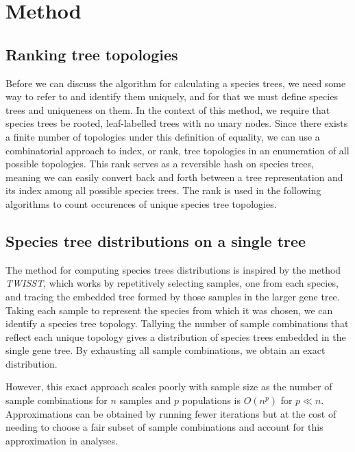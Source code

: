 \documentclass{article}
\newcommand{\twisst}{{\textit{TWISST}}}
\begin{document}
\section{Method}
\subsection{Ranking tree topologies}

Before we can discuss the algorithm for calculating a species trees, we
need some way to refer to and identify them uniquely, and for that we must
define species trees and uniqueness on them. In the context of this method,
we require that species trees be rooted, leaf-labelled trees with no
unary nodes.
Since there exists a finite number of topologies under this definition
of equality, we can use a combinatorial approach to index, or rank,
tree topologies in an enumeration of all possible topologies.
This rank serves as a reversible hash on species trees, meaning we can
easily convert back and forth between a tree representation and its
index among all possible species trees. The rank is used in the following
algorithms to count occurences of unique species tree topologies.

\subsection{Species tree distributions on a single tree}

The method for computing species trees distributions is inspired by the method
\twisst, which works
by repetitively selecting samples, one from each species, and tracing the
embedded tree formed by those samples in the larger gene tree. Taking each
sample to represent the species from which it was chosen, we can identify
a species tree topology. Tallying the number of sample combinations that
reflect each unique topology gives a distribution of species trees
embedded in the single gene tree. By exhausting all sample combinations,
we obtain an exact distribution.

However, this exact approach scales poorly with sample size as the number
of sample combinations for $n$ samples and $p$ populations is $O(n^p)$ for
$p \ll n$. Approximations can be obtained by running fewer iterations but
at the cost of needing to choose a fair subset of sample combinations and
account for this approximation in analyses.
\end{document}
